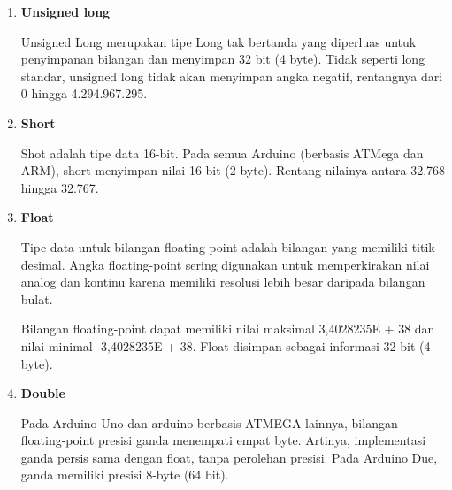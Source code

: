 \begin{enumerate}
\begin{enumerate}
    \item \textbf{Unsigned long}
    \par Unsigned Long merupakan tipe Long tak bertanda yang diperluas untuk penyimpanan bilangan dan menyimpan 32 bit (4 byte). Tidak seperti long standar, unsigned long tidak akan menyimpan angka negatif, rentangnya dari 0 hingga 4.294.967.295.
    
    
    \item \textbf{Short}
    \par Shot adalah tipe data 16-bit. Pada semua Arduino (berbasis ATMega dan ARM), short menyimpan nilai 16-bit (2-byte). Rentang nilainya antara 32.768 hingga 32.767.
    
    
    \item \textbf{Float}
    \par Tipe data untuk bilangan floating-point adalah bilangan yang memiliki titik desimal. Angka floating-point sering digunakan untuk memperkirakan nilai analog dan kontinu karena memiliki resolusi lebih besar daripada bilangan bulat.

    \par Bilangan floating-point dapat memiliki nilai maksimal 3,4028235E + 38 dan nilai minimal -3,4028235E + 38. Float disimpan sebagai informasi 32 bit (4 byte).
    
    
    \item \textbf{Double}
    \par Pada Arduino Uno dan arduino berbasis ATMEGA lainnya, bilangan floating-point presisi ganda menempati empat byte. Artinya, implementasi ganda persis sama dengan float, tanpa perolehan presisi. Pada Arduino Due, ganda memiliki presisi 8-byte (64 bit).


\end{enumerate}
\end{enumerate}
